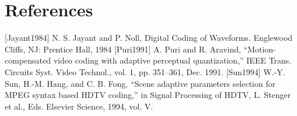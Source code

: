 \documentclass[smallabstract,smallcaptions]{dccpaper}
\begin{document}

\section*{References}



[Jayant1984] N. S. Jayant and P. Noll, Digital Coding of Waveforms. Englewood
Cliffs, NJ: Prentice Hall, 1984
[Puri1991] A. Puri and R. Aravind, “Motion-compensated video coding with
adaptive perceptual quantization,” IEEE Trans. Circuits Syst. Video
Technol., vol. 1, pp. 351–361, Dec. 1991.
[Sun1994] W.-Y. Sun, H.-M. Hang, and C. B. Fong, “Scene adaptive parameters
selection for MPEG syntax based HDTV coding,” in Signal Processing
of HDTV, L. Stenger et al., Eds. Elsevier Science, 1994, vol. V.
\end{document}
